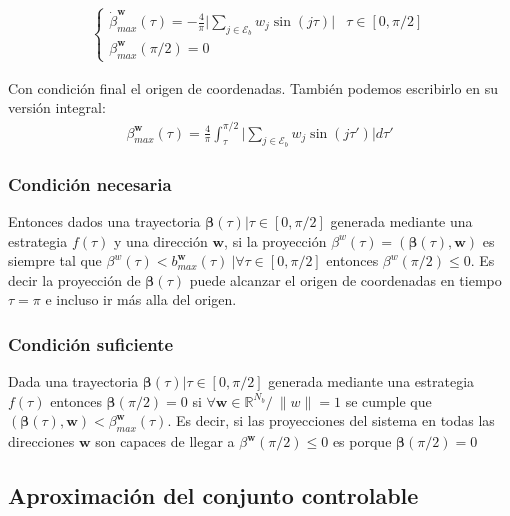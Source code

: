 \begin{gather}
    \begin{cases}
        \displaystyle \dot{\beta}^{\bm{w}}_{max}(\tau) = -\frac{4}{\pi} 
        \Big|\sum_{j\in \mathcal{E}_b}  w_j \sin(j\tau) \Big|
         & \tau \in [0,\pi/2]\\
        \displaystyle \beta^{\bm{w}}_{max}(\pi/2) = 0   
    \end{cases}
\end{gather}

Con condición final el origen de coordenadas. También podemos escribirlo en  su versión integral:
\begin{gather}
    \beta^{\bm{w}}_{max}(\tau) = \frac{4}{\pi} \int_\tau^{\pi/2}
    \Big| \sum_{j\in \mathcal{E}_b} w_j \sin(j\tau') \Big| d\tau'
\end{gather}

\subsubsection{Condición necesaria}


Entonces dados una trayectoria $\bm{\beta}(\tau)  |  \tau \in [0,\pi/2]$ generada mediante una estrategia $f(\tau)$ y una dirección $\bm{w}$, si la proyección  $\beta^w(\tau) = (\bm{\beta}(\tau),\bm{w})$ es siempre tal que $ \beta^w(\tau) < b^{\bm{w}}_{max }(\tau) \ |  \forall \tau \in [0,\pi/2]$ entonces $\beta^w(\pi/2)\leq 0$. Es decir la proyección de $\bm{\beta}(\tau)$ puede alcanzar el origen de coordenadas en tiempo $\tau = \pi$ e incluso ir más alla del origen.

\subsubsection{Condición suficiente}

Dada una trayectoria $\bm{\beta}(\tau)|  \tau \in [0,\pi/2]$ generada mediante una estrategia $f(\tau)$  entonces $\bm{\beta}(\pi/2) = 0$ si $\forall \bm{w} \in \mathbb{R}^{N_b}  /  \ \|w\|=1$  se cumple que $(\bm{\beta}(\tau),\bm{w}) < \beta^{\bm{w}}_{max}(\tau)$. Es decir, si las proyecciones del sistema en todas las direcciones $\bm{w}$ son capaces de llegar a $\beta^{\bm{w}}(\pi/2)\leq 0$ es porque $\bm{\beta}(\pi/2) = 0$


\subsection{Aproximación del conjunto controlable}

